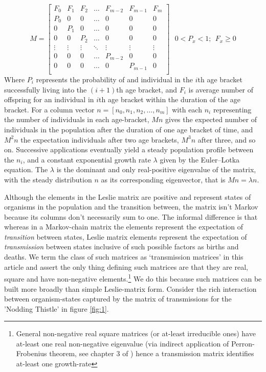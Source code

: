 \begin{equation*}
M=\begin{bmatrix}
    F_0 & F_1 & F_2 & \dots  & F_{m-2} & F_{m-1} & F_m  \\
    P_0 &  0  &  0  & \dots  &    0    &  0      &  0   \\
     0  & P_1 &  0  & \dots  &    0    &  0      &  0   \\
     0  &  0  & P_2 & \dots  &    0    &  0      &  0   \\
    \vdots & \vdots & \vdots & \ddots & \vdots & \vdots & \vdots \\
     0  &  0  &  0  & \dots  & P_{m-2} &  0      &  0   \\
     0  &  0  &  0  & \dots  &    0    & P_{m-1} &  0   \\
\end{bmatrix}
~~~0<P_x<1;~~F_x\ge0
\end{equation*}
Where $P_i$ represents the probability of and individual in the $i$th age bracket successfully living into the $(i+1)$th age bracket, and $F_i$ is average number of offspring for an individual in $i$th age bracket within the duration of the age bracket.
For a column vector $n = [n_0,n_1,n_2,\dots,n_m]$ with each $n_i$ representing the number of individuals in each age-bracket, $Mn$ gives the expected number of individuals in the population after the duration of one age bracket of time, and $M^2n$ the expectation individuals after two age brackets, $M^3n$ after three, and so on.
Successive applications eventually yield a steady population profile between the $n_i$, and a constant exponential growth rate $\lambda$ given by the Euler–Lotka equation.
The $\lambda$ is the dominant and only real-positive eigenvalue of the matrix, with the steady distribution $n$ as its corresponding eigenvector, that is $Mn=\lambda n$.

Although the elements in the Leslie matrix are positive and represent states of organisms in the population and the transition between, the matrix isn't Markov because its columns don't necessarily sum to one.  The informal difference is that whereas in a Markov-chain matrix the elements represent the expectation of \textit{transition} between states, Leslie matrix elements represent the expectation of \textit{transmission} between states inclusive of such possible factors as births and deaths.
We term the class of such matrices as `transmission matrices' in this article and assert the only thing defining such matrices are that they are real, square and have non-negative elements.\footnote{General non-negative real square matrices (or at-least irreducible ones) have at-least one real non-negative eigenvalue (via indirect application of Perron-Frobenius theorem, see chapter 3 of \cite{matrix2}) hence a transmission matrix identifies at-least one growth-rate}
We do this because such matrices can be built more broadly than simple Leslie-matrix form\cite{models1,models2}. Consider the rich interaction between organism-states captured by the matrix of transmissions for the 'Nodding Thistle' in figure \ref{fig:1}.



